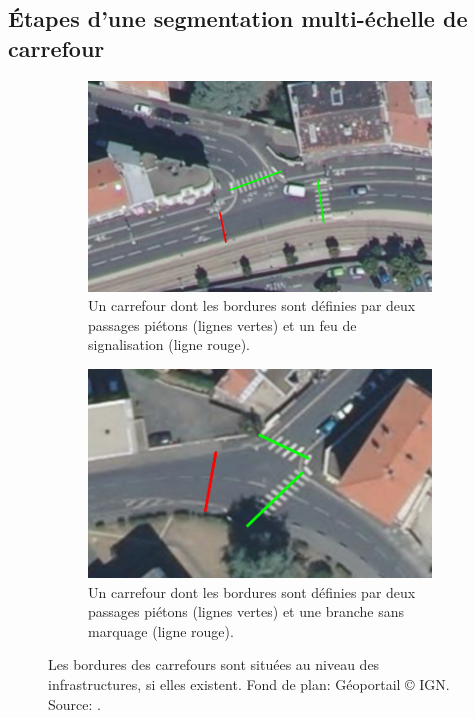 \subsection{Étapes d'une segmentation multi-échelle de carrefour}

\begin{figure}
    \centering
    \begin{subfigure}[t]{.49\linewidth}
        \includegraphics[width=\textwidth]{images/modelisation/segmentation/orthophoto-1.pdf}
        \caption{Un carrefour dont les bordures sont définies par deux passages piétons (lignes vertes) et un feu de signalisation (ligne rouge).\label{fig:modelisation_limite_carrefourA}}
    \end{subfigure}
    \begin{subfigure}[t]{.49\linewidth}
        \includegraphics[width=\textwidth]{images/modelisation/segmentation/orthophoto-2.pdf}
        \caption{Un carrefour dont les bordures sont définies par deux passages piétons (lignes vertes) et une branche sans marquage (ligne rouge). \label{fig:modelisation_limite_carrefourB}}
    \end{subfigure}
    \caption{Les bordures des carrefours sont situées au niveau des infrastructures, si elles existent. Fond de plan: Géoportail © IGN. Source: \cite{Favreau2022}.}
    \label{fig:modelisation_limite_carrefour}
\end{figure}

